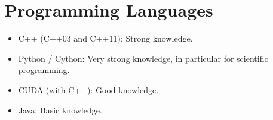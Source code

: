 \documentclass[a4paper,11pt]{article}
\begin{document}
\section{Programming Languages}
\begin{itemize}
    \item C++ (C++03 and C++11): Strong knowledge.
    \item Python / Cython: Very strong knowledge, in particular for scientific programming.
    \item CUDA (with C++): Good knowledge.
    \item Java: Basic knowledge.
\end{itemize}

\begin{publications}
\end{publications}
\end{document}
